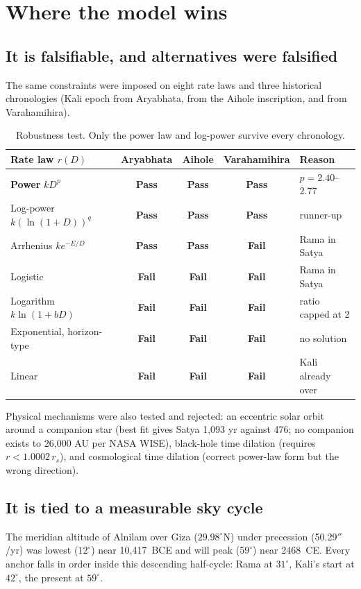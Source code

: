 \documentclass[11pt,a4paper]{article}
\newcommand{\pass}{\textcolor{green!50!black}{\textbf{Pass}}}
\newcommand{\fail}{\textcolor{red!70!black}{\textbf{Fail}}}
\begin{document}
\section{Where the model wins}

\subsection{It is falsifiable, and alternatives were falsified}
The same constraints were imposed on eight rate laws and three historical chronologies (Kali epoch from Aryabhata, from the Aihole inscription, and from Varahamihira).

\begin{table}[H]
\centering
\small
\begin{tabular}{@{}lcccl@{}}
\toprule
Rate law $r(D)$ & Aryabhata & Aihole & Varahamihira & Reason \\
\midrule
\textbf{Power} $kD^{p}$ & \pass & \pass & \pass & $p = 2.40$--$2.77$ \\
Log-power $k(\ln(1+D))^{q}$ & \pass & \pass & \pass & runner-up \\
Arrhenius $k e^{-E/D}$ & \pass & \pass & \fail & Rama in Satya \\
Logistic & \fail & \fail & \fail & Rama in Satya \\
Logarithm $k\ln(1+bD)$ & \fail & \fail & \fail & ratio capped at 2 \\
Exponential, horizon-type & \fail & \fail & \fail & no solution \\
Linear & \fail & \fail & \fail & Kali already over \\
\bottomrule
\end{tabular}
\caption{Robustness test. Only the power law and log-power survive every chronology.}
\end{table}

\noindent Physical mechanisms were also tested and rejected: an eccentric solar orbit around a companion star (best fit gives Satya 1{,}093 yr against 476; no companion exists to 26{,}000 AU per NASA WISE), black-hole time dilation (requires $r < 1.0002\,r_s$), and cosmological time dilation (correct power-law form but the wrong direction).

\subsection{It is tied to a measurable sky cycle}
The meridian altitude of Alnilam over Giza ($29.98^\circ$N) under precession (50.29$''$/yr) was lowest ($12^\circ$) near 10{,}417~BCE and will peak ($59^\circ$) near 2468~CE. Every anchor falls in order inside this descending half-cycle: Rama at $31^\circ$, Kali's start at $42^\circ$, the present at $59^\circ$.
\end{document}
